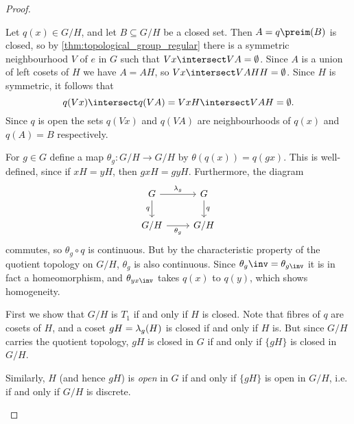 \documentclass[article, a4paper, 11pt, oneside]{memoir}
\numberwithin{equation}{chapter}
\begin{document}
\begin{proof}
\begin{proofsec}
    \item[Proof of \subcref{enum:coset_space_regular}]
    Let $q(x) \in G/H$, and let $B \subseteq G/H$ be a closed set. Then $A = q\preim(B)$ is closed, so by \cref{thm:topological_group_regular} there is a symmetric neighbourhood $V$ of $e$ in $G$ such that $Vx \intersect VA = \emptyset$. Since $A$ is a union of left cosets of $H$ we have $A = AH$, so $Vx \intersect VAHH = \emptyset$. Since $H$ is symmetric, it follows that
    \begin{equation*}
        q(Vx) \intersect q(VA)
            = VxH \intersect VAH
            = \emptyset.
    \end{equation*}
    Since $q$ is open the sets $q(Vx)$ and $q(VA)$ are neighbourhoods of $q(x)$ and $q(A) = B$ respectively.

    \item[Proof of \subcref{enum:coset-space-homogeneous}]
    For $g \in G$ define a map $\theta_g \colon G/H \to G/H$ by $\theta(q(x)) = q(gx)$. This is well-defined, since if $xH = yH$, then $gxH = gyH$. Furthermore, the diagram
    \begin{equation*}
        \begin{tikzcd}
            G
                \ar[r, "\leftmult_g"]
                \ar[d, "q", swap]
            & G
                \ar[d, "q"] \\
            G/H
                \ar[r, "\theta_g", swap]
            & G/H
        \end{tikzcd}
    \end{equation*}
    commutes, so $\theta_g \circ q$ is continuous. But by the characteristic property of the quotient topology on $G/H$, $\theta_g$ is also continuous. Since $\theta_g\inv = \theta_{g\inv}$ it is in fact a homeomorphism, and $\theta_{yx\inv}$ takes $q(x)$ to $q(y)$, which shows homogeneity.

    \item[Proof of \subcref{enum:coset_space_T1} and \subcref{enum:coset-space-discrete}]
    First we show that $G/H$ is $T_1$ if and only if $H$ is closed. Note that fibres of $q$ are cosets of $H$, and a coset $gH = \lambda_g(H)$ is closed if and only if $H$ is. But since $G/H$ carries the quotient topology, $gH$ is closed in $G$ if and only if $\{gH\}$ is closed in $G/H$.
    
    Similarly, $H$ (and hence $gH$) is \emph{open} in $G$ if and only if $\{gH\}$ is open in $G/H$, i.e. if and only if $G/H$ is discrete.
\end{proofsec}
\end{proof}
\end{document}
